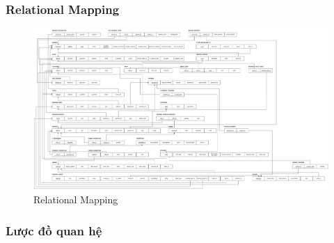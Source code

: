 \subsubsection{Relational Mapping}

\begin{landscape}

\begin{figure}[H]
    \centering
    \includegraphics[height=0.9\textheight]{Images/relation.png}
    \vspace{0.5cm}
    \caption{Relational Mapping}
    \label{fig:my_label}
\end{figure}

\end{landscape}


\subsubsection{Lược đồ quan hệ}

